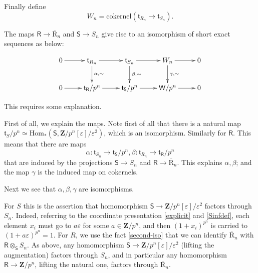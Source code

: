 \documentclass[10pt]{amsart}
\newcommand{\Z}{\mathbf{Z}}
\newcommand{\usbR}{\overline{\mathrm{R}}}
\newcommand{\Winf}{\mathsf{W}}
\newcommand{\Hom}{\mathrm{Hom}}
\newcommand{\Sinf}{\mathsf{S}}
\newcommand{\Rinf}{\mathsf{R}}
\theoremstyle{remark}
\begin{document}
Finally define   
\begin{equation} \label{Wndef} W_n = \mathrm{cokernel} \left( \mathfrak{t}_{R_n} \rightarrow \mathfrak{t}_{S_n}\right). 
\end{equation}


 

 

The maps $\Rinf \rightarrow \usbR_n$ and $\Sinf \rightarrow S_n$ give rise to an isomorphism 
of short exact sequences as below: 
 
 \begin{equation} \label{feeling_groovy2}
 \xymatrix{
 0 \ar[r] & \mathfrak{t}_{R_n} \ar[r]\ar[d]^{\alpha, \sim}  & \mathfrak{t}_{S_n} \ar[d]^{\beta,\sim}  \ar[r]  & W_n   \ar[d]^{\gamma, \sim} \ar[r] & 0  \\
 0 \ar[r] & \mathfrak{t}_{\Rinf}/p^n \ar[r]    &\mathfrak{t}_{\Sinf}/p^n  \ar[r] & \Winf/p^n  \ar[r] &0 \\
 }
 \end{equation} 
 
This requires some explanation.   

First of all,  we explain the maps.  Note first of all
that there is a natural map  $\mathfrak{t}_S/p^n \simeq \Hom_{*}(\Sinf, \Z/p^n[\varepsilon]/\varepsilon^2)$,
which is an isomorphism. Similarly for $\Rinf$. 
 This means that there are maps 
\begin{equation} \label{gogo}   \alpha: \mathfrak{t}_{S_n} \rightarrow \mathfrak{t}_{\Sinf}/p^n,   \beta:  \mathfrak{t}_{R_n} \rightarrow \mathfrak{t}_{\Rinf}/p^n\end{equation} 
that are induced by the projections $\Sinf \rightarrow S_n$ and $\Rinf \rightarrow \usbR_n$.
This explains $\alpha, \beta$; and the map $\gamma$ is the induced map on cokernels.  

Next we see that $\alpha, \beta, \gamma$ are isomorphisms. 

For $S$ this is the assertion that homomorphism $\Sinf \rightarrow \Z/p^n[\varepsilon]/\varepsilon^2$ 
factors through $S_n$. Indeed,  referring to the coordinate presentation \eqref{explicit} and \eqref{Sinfdef},  each element $x_i$ must go to   $a\varepsilon$ for some $a \in \Z/p^n$, 
and then $(1+x_i)^{p^n}$ is carried to $(1+a \varepsilon)^{p^n} = 1$. 
For $R$, we use the fact \eqref{second-iso}    that   we can identify $\usbR_n$ with $\Rinf\otimes_{\Sinf} S_n$. 
As above, any homomorphism $\Sinf \rightarrow \Z/p^n[\varepsilon]/\varepsilon^2$  (lifting the augmentation) factors through
$S_n$,  and in particular any homomorphism $\Rinf \rightarrow \Z/p^n$, lifting the natural one,
factors  through $\usbR_n$. 
\end{document}
